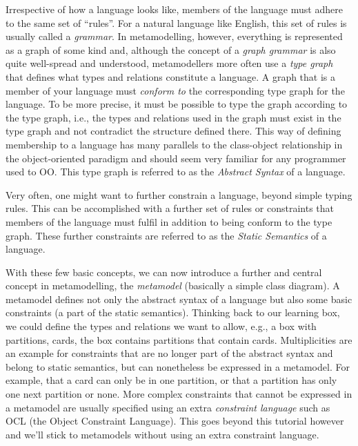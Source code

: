 Irrespective of how a language looks like, members of the language must adhere to the same set of ``rules''.  
For a natural language like English, this set of rules is usually called a \emph{grammar}.  
In metamodelling, however, everything is represented as a graph of some kind and, although the concept of a  \emph{graph grammar} is also quite well-spread and understood, metamodellers  more often use a \emph{type graph} that defines what types and relations  constitute a language. 
A graph that is a member of your language must \emph{conform to} the corresponding type graph for the language.
To be more precise, it must be possible to type the graph according to the type graph, i.e., the types and relations used in the graph must exist in the type graph and not contradict the structure defined there.  
This way of defining membership to a language has many parallels to the class-object relationship in the object-oriented paradigm and should seem very familiar for any programmer used to OO.
This type graph is referred to as the \emph{Abstract Syntax} of a language. 

Very often, one might want to further constrain a language, beyond simple typing rules.  
This can be accomplished with a further set of rules or constraints that members of the language must fulfil in addition to being conform to the type graph.
These further constraints are referred to as the \emph{Static Semantics} of a language.    

With these few basic concepts, we can now introduce a further and central concept in metamodelling, the \emph{metamodel} (basically a simple class diagram). 
A metamodel defines not only the abstract syntax of a language but also some basic constraints (a part of the static semantics).  
Thinking back to our learning box, we could define the types and relations we want to allow, e.g.,  a box with partitions, cards, the box contains partitions that contain cards. 
Multiplicities are an example for constraints that are no longer part of the abstract syntax and belong to static semantics, but can nonetheless be expressed in a metamodel.
For example, that a card can only be in one partition, or that a partition has only one next partition or none.
More complex constraints that cannot be expressed in a metamodel are usually specified using an extra \emph{constraint language} such as OCL (the Object Constraint Language).
This goes beyond this tutorial however and we'll stick to metamodels without using an extra constraint language.              


